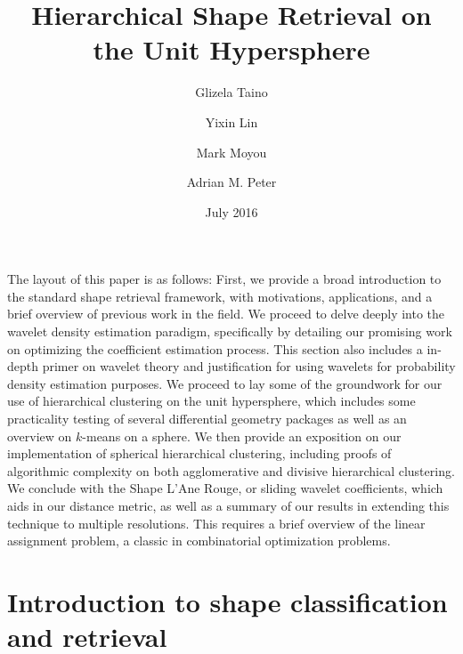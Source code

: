 \documentclass{article}
\begin{document}
\date{July 2016}

\title{Hierarchical Shape Retrieval on the Unit Hypersphere}
\author{Glizela Taino}
\author{Yixin Lin}

\author{Mark Moyou}
\author{Adrian M. Peter}
\setcounter{Maxaffil}{0}
\renewcommand\Affilfont{\small}
\maketitle



The layout of this paper is as follows:
  First, we provide a broad introduction to the standard shape retrieval framework, with motivations, applications, and a brief overview of previous work in the field. We proceed to delve deeply into the wavelet density estimation paradigm, specifically by detailing our promising work on optimizing the coefficient estimation process. This section also includes a in-depth primer on wavelet theory and justification for using wavelets for probability density estimation purposes. We proceed to lay some of the groundwork for our use of hierarchical clustering on the unit hypersphere, which includes some practicality testing of several differential geometry packages as well as an overview on $k$-means on a sphere. We then provide an exposition on our implementation of spherical hierarchical clustering, including proofs of algorithmic complexity on both agglomerative and divisive hierarchical clustering. We conclude with the Shape L'Ane Rouge, or sliding wavelet coefficients, which aids in our distance metric, as well as a summary of our results in extending this technique to multiple resolutions. This requires a brief overview of the linear assignment problem, a classic in combinatorial optimization problems.

\part{Introduction to shape classification and retrieval}
  
  
  
  
\end{document}
